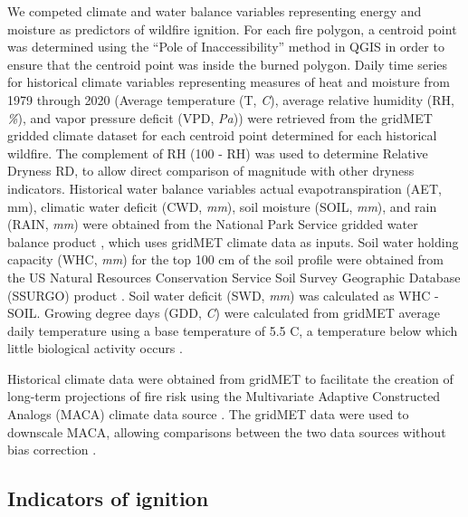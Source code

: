 \documentclass[11p]{article}
\begin{document}

We competed climate and water balance variables representing energy and moisture as predictors of wildfire ignition. For each fire polygon, a centroid point was determined using the ``Pole of Inaccessibility'' method in QGIS in order to ensure that the centroid point was inside the burned polygon. Daily time series for historical climate variables representing measures of heat and moisture from 1979 through 2020 (Average temperature (T, \textit{\degree C}), average relative humidity (RH, \textit{\%}), and vapor pressure deficit (VPD, \textit{Pa})) were retrieved from the gridMET gridded climate dataset \citep{abatzoglouDevelopmentGriddedSurface2013} for each centroid point determined for each historical wildfire. The complement of RH (100 - RH) was used to determine Relative Dryness RD, to allow direct comparison of magnitude with other dryness indicators. Historical water balance variables actual evapotranspiration (AET, mm), climatic water deficit (CWD, \textit{mm}), soil moisture (SOIL, \textit{mm}), and rain (RAIN, \textit{mm}) were obtained from the National Park Service gridded water balance product \citep{tercekHistoricalChangesPlant2021}, which uses gridMET climate data as inputs. Soil water holding capacity (WHC, \textit{mm}) for the top 100 cm of the soil profile were obtained from the US Natural Resources Conservation Service 
Soil Survey Geographic Database (SSURGO) product \citep{naturalresourcesconservationserviceSoilSurveyGeographic2015}. Soil water deficit (SWD, \textit{mm}) was calculated as WHC - SOIL. Growing degree days (GDD, \textit{\degree C}) were calculated from gridMET average daily temperature using a base temperature of 5.5 \degree C, a temperature below which little biological activity occurs \citep{mcmasterGrowingDegreedaysOne1997}. 

Historical climate data were obtained from gridMET to facilitate the creation of long-term projections of fire risk using the Multivariate Adaptive Constructed Analogs (MACA) climate data source \citep{abatzoglouComparisonStatisticalDownscaling2012}. The gridMET data were used to downscale MACA, allowing comparisons between the two data sources without bias correction \citep{tercekRobustProjectionsConsequences2023}.

\subsection{Indicators of ignition}
\end{document}
